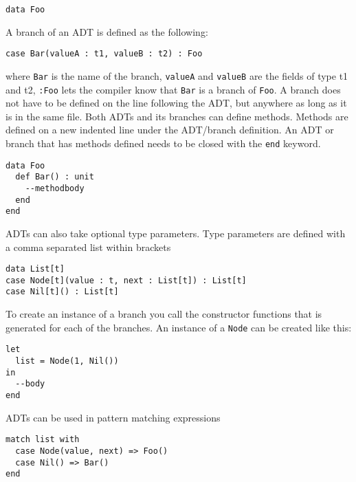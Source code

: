 \documentclass[10pt]{report}
\def\code#1{\texttt{#1}} %
\begin{document}
{\begin{lstlisting}[language=Encore]
data Foo
\end{lstlisting}
A branch of an ADT is defined as the following:
\begin{lstlisting}[language=Encore]
case Bar(valueA : t1, valueB : t2) : Foo
\end{lstlisting}
\par{where \code{Bar} is the name of the branch, \code{valueA} and \code{valueB} are the fields of type t1 and t2, \code{:Foo} lets the compiler know that \code{Bar} is a branch of \code{Foo}.%
A branch does not have to be defined on the line following the ADT, but anywhere as long as it is in the same file.
Both ADTs and its branches can define methods. Methods are defined on a new indented line under the ADT/branch definition.
An ADT or branch that has methods defined needs to be closed with the \code{end} keyword.}
\begin{lstlisting}[language=encore,caption={ADT definition with a method}]
data Foo
  def Bar() : unit
    --methodbody
  end
end
\end{lstlisting}
\par{ADTs can also take optional type parameters. Type parameters are defined with a comma separated list within brackets}
\begin{lstlisting}[language=encore,caption={Generic linked list implemented with an ADT}]
data List[t]
case Node[t](value : t, next : List[t]) : List[t]
case Nil[t]() : List[t]
\end{lstlisting}
\par{To create an instance of a branch you call the constructor functions that is generated for each of the branches.
An instance of a \code{Node} can be created like this:}
\begin{lstlisting}[language=encore,caption={Declaration of a list containing one element}]
let
  list = Node(1, Nil())
in
  --body
end
\end{lstlisting}
\par{ADTs can be used in pattern matching expressions}
\begin{lstlisting}[language=encore,caption={Pattern matching on a linked list}]
match list with
  case Node(value, next) => Foo()
  case Nil() => Bar()
end
\end{lstlisting}
}
\end{document}
